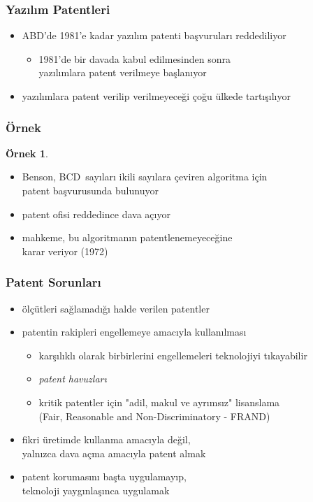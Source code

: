 \documentclass[dvipsnames]{beamer}
\theoremstyle{definition}
\theoremstyle{example}
\newtheorem{ornek}[theorem]{Örnek}
\theoremstyle{plain}
\begin{document}
\begin{frame}
  \frametitle{Yazılım Patentleri}

  \begin{itemize}
    \item ABD'de 1981'e kadar yazılım patenti başvuruları reddediliyor
    \begin{itemize}
      \item 1981'de bir davada kabul edilmesinden sonra\\
        yazılımlara patent verilmeye başlanıyor
    \end{itemize}

    \pause
    \medskip
    \item yazılımlara patent verilip verilmeyeceği çoğu ülkede tartışılıyor
  \end{itemize}
\end{frame}

\begin{frame}
  \frametitle{Örnek}

  \begin{ornek}
    \begin{itemize}
      \item Benson, BCD~sayıları ikili sayılara çeviren algoritma için\\
        patent başvurusunda bulunuyor
      \item patent ofisi reddedince dava açıyor
      \item mahkeme, bu algoritmanın patentlenemeyeceğine\\
        karar veriyor (1972)
    \end{itemize}
  \end{ornek}
\end{frame}

\begin{frame}
  \frametitle{Patent Sorunları}

  \begin{itemize}
    \item ölçütleri sağlamadığı halde verilen patentler
    
    \medskip
    \item patentin rakipleri engellemeye amacıyla kullanılması
    \begin{itemize}
      \item karşılıklı olarak birbirlerini engellemeleri teknolojiyi tıkayabilir
      \item \emph{patent havuzları}
      \item kritik patentler için "adil, makul ve ayrımsız" lisanslama\\
        (Fair, Reasonable and Non-Discriminatory - FRAND)
    \end{itemize}

    \medskip
    \item fikri üretimde kullanma amacıyla değil,\\
      yalnızca dava açma amacıyla patent almak

    \medskip
    \item patent korumasını başta uygulamayıp,\\
      teknoloji yaygınlaşınca uygulamak
  \end{itemize}
\end{frame}
\end{document}
